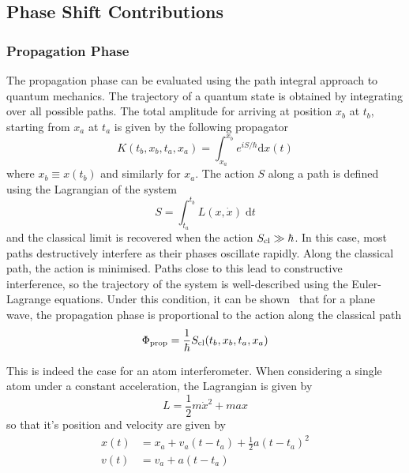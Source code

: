 \subsection{Phase Shift Contributions}\label{subsec:theory_path}
\subsubsection{Propagation Phase}
The propagation phase can be evaluated using the path integral
approach to quantum mechanics. The trajectory of
a quantum state is obtained by integrating over all possible paths.
The total amplitude for arriving at position $x_b$ at $t_b$, starting
from $x_a$ at $t_a$ is given by the following propagator
\begin{equation}
  K(t_b,x_b,t_a,x_a) = \int_{x_a}^{x_b} e^{i S/\hbar} \mathrm{d}x(t)  
\end{equation}
where $x_b \equiv x(t_b)$ and similarly for $x_a$. The action $S$
along a path is
defined using the Lagrangian of the system
\begin{equation}
  S = \int_{t_a}^{t_b} L(x,\dot{x})\; \mathrm{d}t
  \label{eq:action_def}
\end{equation}
and the classical limit is recovered when the action $S_\textnormal{cl}
\gg
\hbar$. In this case, most paths destructively interfere as their
phases oscillate rapidly. Along the classical path, the action is
minimised. Paths close to this lead to constructive interference, so
the trajectory of the system is well-described using the Euler-Lagrange equations. Under this
condition, it can be shown~\cite{Storey1994} that for a plane wave,
the propagation phase is proportional to the action along the
classical path
\begin{equation}
  \label{eq:prop_phase}
  \Phi_\textnormal{prop} = \frac{1}{\hbar} S_\textnormal{cl}(t_b,x_b,t_a,x_a)
\end{equation}
\par\noindent
This is indeed the case for an atom interferometer. When considering a
single atom under a constant
acceleration, the Lagrangian is given by
\begin{equation}
  \label{eq:lagrange_acc}
  L = \frac{1}{2}m\dot{x}^2 + m a x
\end{equation}
so that it's position and velocity are given by
\begin{subequations}
\begin{align}
  x(t) &= x_a + v_a (t-t_a) + \frac{1}{2} a (t-t_a)^2 \\
  v(t) &= v_a + a(t-t_a)
\end{align}
\end{subequations}
